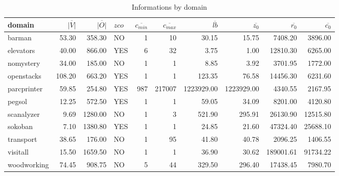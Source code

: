 \begin{table*}[htbp]
\centering
\begin{tabular}{lrrlrrrrrr}
  \hline
domain & $\overline{|V|}$ & $\overline{|O|}$ & $zco$ & $\overline{c_{min}}$ & $\overline{c_{max}}$ & $\overline{lb}$ & $\overline{z_0}$ & $\overline{r_0}$ & $\overline{c_0}$ \\ 
  \hline
barman & 53.30 & 358.30 & NO &   1 &  10 & 30.15 & 15.75 & 7408.20 & 3896.00 \\ 
  elevators & 40.00 & 866.00 & YES &   6 &  32 & 3.75 & 1.00 & 12810.30 & 6265.00 \\ 
  nomystery & 34.00 & 185.00 & NO &   1 &   1 & 8.85 & 3.92 & 3701.95 & 1772.00 \\ 
  openstacks & 108.20 & 663.20 & YES &   1 &   1 & 123.35 & 76.58 & 14456.30 & 6231.60 \\ 
  parcprinter & 59.85 & 254.80 & YES & 987 & 217007 & 1223929.00 & 1223929.00 & 4340.55 & 2167.95 \\ 
  pegsol & 12.25 & 572.50 & YES &   1 &   1 & 59.05 & 34.09 & 8201.00 & 4120.80 \\ 
  scanalyzer & 9.69 & 1280.00 & NO &   1 &   3 & 521.90 & 295.91 & 26130.90 & 12515.80 \\ 
  sokoban & 7.10 & 1380.80 & YES &   1 &   1 & 24.85 & 21.60 & 47324.40 & 25688.10 \\ 
  transport & 38.65 & 176.00 & NO &   1 &  95 & 41.80 & 40.78 & 2096.25 & 1406.55 \\ 
  visitall & 15.50 & 1659.50 & NO &   1 &   1 & 36.90 & 30.62 & 189001.61 & 91734.22 \\ 
  woodworking & 74.45 & 908.75 & NO &   5 &  44 & 329.50 & 296.40 & 17438.45 & 7980.70 \\ 
   \hline
\end{tabular}
\caption{Informations by domain} 
\label{tab:domains}
\end{table*}
